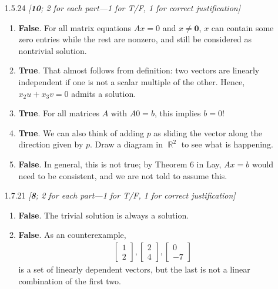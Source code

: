 \documentclass{amsart}
\theoremstyle{definition}
\theoremstyle{definition}
\DeclareMathOperator{\R}{\mathbb{R}}
\DeclareMathOperator{\1}{\mathbbm{1}}
\begin{document}
\begin{enumerate}[itemsep = 2mm]
	
	\item[1.5.24] \textit{[\textbf{10}; 2 for each part---1 for T/F, 1 for correct justification]}
	
	\begin{enumerate}
		\item \textbf{False}. For all matrix equations $Ax = 0$ and $x \neq \mathbf{0}$, $x$ can contain some zero entries while the rest are nonzero, and still be considered as nontrivial solution.
		
		\item \textbf{True}. That almost follows from definition: two vectors are linearly independent if one is not a scalar multiple of the other. Hence, $x_2 u + x_3 v = 0$ admits a solution.
		
		
		\item \textbf{True}. For all matrices $A$ with $A0 = b$, this implies $b = 0$!
		
		\item \textbf{True}. We can also think of adding $p$ as sliding the vector along the direction given by $p$. Draw a diagram in $\R^2$ to see what is happening.
		
		\item \textbf{False}. In general, this is not true; by Theorem 6 in Lay, $Ax =b$ would need to be consistent, and we are not told to assume this.
	\end{enumerate}
	
	
	
	\item[1.7.21] \textit{[\textbf{8}; 2 for each part---1 for T/F, 1 for correct justification]}
	
	\begin{enumerate}
		\item \textbf{False}. The trivial solution is always a solution.
		
		\item \textbf{False}. As an counterexample,
		\begin{align*}
		\begin{bmatrix} 1 \\ 2 \end{bmatrix}, \begin{bmatrix} 2 \\ 4 \end{bmatrix}, \begin{bmatrix} 0 \\ -7 \end{bmatrix}
		\end{align*}
		is a set of linearly dependent vectors, but the last is not a linear combination of the first two.
		

\end{enumerate}
\end{enumerate}
\end{document}
